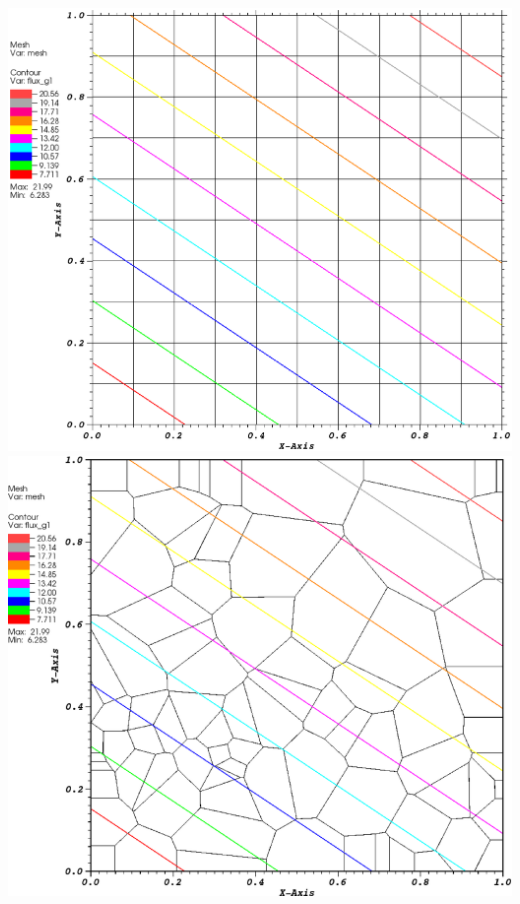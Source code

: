 \documentclass[compress,10pt]{beamer}
\begin{document}
\begin{frame}[t]
{\begin{columns}
\vspace{3mm}
{}\includegraphics[width=0.95\columnwidth]{images/cart_MAXENT_k1.eps}
\centering
{}\includegraphics[width=0.95\columnwidth]{images/shes_poly_MAXENT_k1.eps} \\
\vspace{3mm}

\end{columns}}
\end{frame}
\end{document}

